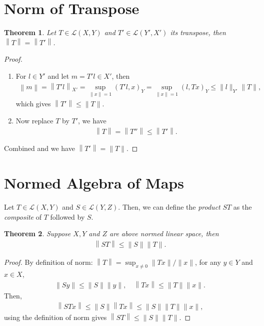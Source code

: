 \documentclass[11pt]{book}
\newtheorem{theorem}{Theorem}[chapter]
\theoremstyle{definition}
\numberwithin{equation}{chapter}
\begin{document}
\medskip

\section{Norm of Transpose}
\begin{theorem}
Let $T \in \mathscr{L}(X, Y)$ and $T' \in \mathscr{L}(Y', X')$ its transpose, then $\left\|T\right\| = \left\|T'\right\|$.
\end{theorem}
\begin{proof}
~\begin{enumerate}[label=(\alph*)]
    \item For $l \in Y'$ and let $m = T'l \in X'$, then
    \begin{align*}
        \left\|m\right\| = \left\|T'l\right\|_{X'} = \sup_{\|x\|=1} \left(T'l, x\right)_{Y} =  \sup_{\|x\|=1} \left(l, Tx\right)_{Y} \leq \|l\|_{Y'} \|T\|, 
    \end{align*}
    which gives $\left\|T'\right\| \leq \|T\|$.
    
    \item Now replace $T$ by $T'$, we have
    \begin{align*}
        \left\|T\right\| = \left\|T''\right\| \leq \left\|T'\right\|.
    \end{align*}
\end{enumerate}
Combined and we have $\left\|T'\right\| = \|T\|$.
\end{proof}

\medskip

\section{Normed Algebra of Maps}

Let $T \in \mathscr{L}(X, Y)$ and $S \in \mathscr{L}(Y, Z)$. Then, we can define the {\em product} $ST$ as the {\em composite} of $T$ followed by $S$.

\medskip

\begin{theorem}
Suppose $X, Y$ and $Z$ are above normed linear space, then 
\begin{align*}
    \left\|ST\right\| \leq \|S\| \|T\|.
\end{align*}
\end{theorem}
\begin{proof}
By definition of norm: $\left\|T\right\| = \sup_{x \neq 0} \|Tx\|/\|x\|$, for any $y \in Y$ and $x \in X$, 
\begin{align*}
    \left\|Sy\right\| \leq \|S\| \|y\|, \quad \left\|Tx\right\| \leq \|T\| \|x\|.
\end{align*}
Then,
\begin{align*}
    \left\|STx\right\| \leq \|S\| \left\|Tx\right\| \leq \|S\| \|T\| \|x\|,
\end{align*}
using the definition of norm gives $\left\|ST\right\| \leq \|S\| \|T\|$.
\end{proof}
\end{document}
